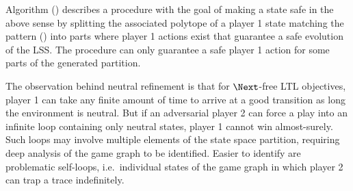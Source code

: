     Algorithm () describes a procedure with the goal of making a state safe in the above sense by splitting the associated polytope of a player 1 state matching the pattern () into parts where player 1 actions exist that guarantee a safe evolution of the LSS.
    The procedure can only guarantee a safe player 1 action for some parts of the generated partition. %

\stopsubsection


    \startalgorithmic[numbering=no,margin=0em]
    \stopalgorithmic
    \startalgorithmic
                \ENDIF
            \ENDIF
        \ENDFOR
    \stopalgorithmic
\stopbuffer

\startsubsection[title={Loop Removal},reference={sec:refinement-product-loops}]


    The observation behind neutral refinement is that for $\Next$-free LTL objectives, player 1 can take any finite amount of time to arrive at a good transition as long the environment is neutral.
    But if an adversarial player 2 can force a play into an infinite loop containing only neutral states, player 1 cannot win almost-surely.
    Such loops may involve multiple elements of the state space partition, requiring deep analysis of the game graph to be identified.
    Easier to identify are problematic self-loops, i.e.\ individual states of the game graph in which player 2 can trap a trace indefinitely.


